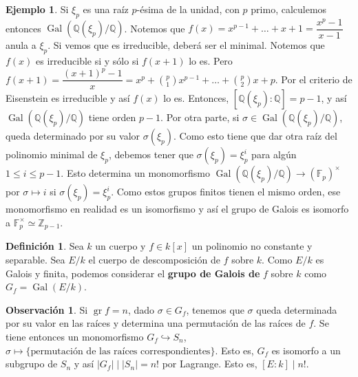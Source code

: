 \documentclass[12pt]{book}
\theoremstyle{definition}
\newtheorem{obs}[teo]{Observación}
\newtheorem{defn}[teo]{Definición}
\newtheorem{ex}[teo]{Ejemplo}
\newcommand{\ZZ}{\mathbb{Z}}      %
\newcommand{\QQ}{\mathbb{Q}}
\newcommand{\FF}{\mathbb{F}}
\DeclareMathOperator{\gr}{gr}
\DeclareMathOperator{\Gal}{Gal}
\begin{document}
\begin{ex}
Si $\xi_p$ es una raíz $p$-ésima de la unidad, con $p$ primo, calculemos entonces $\Gal(\QQ(\xi_p)/\QQ)$. Notemos que $f(x)=x^{p-1} + \ldots + x+1 = \dfrac{x^p - 1}{x-1}$ anula a $\xi_p$. Si vemos que es irreducible, deberá ser el minimal. Notemos que $f(x)$ es irreducible si y sólo si $f(x+1)$ lo es. Pero $f(x+1) = \dfrac{(x+1)^p - 1}{x} = x^p + \binom{p}{1}x^{p-1}+\ldots + \binom{p}{2}x + p$. Por el criterio de Eisenstein es irreducible y así $f(x)$ lo es. Entonces, $[\QQ(\xi_p):\QQ]=p-1$, y así $\Gal(\QQ(\xi_p)/\QQ)$ tiene orden $p-1$. Por otra parte, si $\sigma\in\Gal(\QQ(\xi_p)/\QQ)$, queda determinado por su valor $\sigma(\xi_p)$. Como esto tiene que dar otra raíz del polinomio minimal de $\xi_p$, debemos tener que $\sigma(\xi_p)=\xi_p^i$ para algún $1\leq i \leq p-1$. Esto determina un monomorfismo $\Gal(\QQ(\xi_p)/\QQ)\to (\FF_p)^\times$ por $\sigma\mapsto i$ si $\sigma(\xi_p)=\xi_p^i$. Como estos grupos finitos tienen el mismo orden, ese monomorfismo en realidad es un isomorfismo y así el grupo de Galois es isomorfo a $\FF_p^\times \simeq \ZZ_{p-1}$.
\end{ex}

\begin{defn}
Sea $k$ un cuerpo y $f\in k[x]$ un polinomio no constante y separable. Sea $E/k$ el cuerpo de descomposición de $f$ sobre $k$. Como $E/k$ es Galois y finita, podemos considerar el \textbf{grupo de Galois de} $f$ sobre $k$ como $G_f = \Gal(E/k)$.
\end{defn}

\begin{obs}
Si $\gr f=n$, dado $\sigma\in G_f$, tenemos que $\sigma$ queda determinada por su valor en las raíces y determina una permutación de las raíces de $f$. Se tiene entonces un monomorfismo $G_f\hookrightarrow S_n$, $\sigma\mapsto \{\text{permutación de las raíces correspondientes}\}$. Esto es, $G_f$ es isomorfo a un subgrupo de $S_n$ y así $|G_f|\mid |S_n| = n!$ por Lagrange. Esto es, $[E:k]\mid n!$.
\end{obs}
\end{document}
